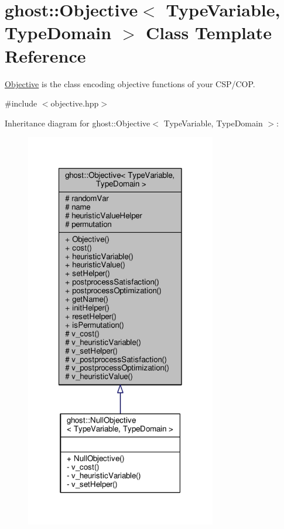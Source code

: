 \hypertarget{classghost_1_1Objective}{\section{ghost\-:\-:Objective$<$ Type\-Variable, Type\-Domain $>$ Class Template Reference}
\label{classghost_1_1Objective}
}


\hyperlink{classghost_1_1Objective}{Objective} is the class encoding objective functions of your C\-S\-P/\-C\-O\-P.  




{\ttfamily \#include $<$objective.\-hpp$>$}



Inheritance diagram for ghost\-:\-:Objective$<$ Type\-Variable, Type\-Domain $>$\-:
\nopagebreak
\begin{figure}[H]
\begin{center}
\leavevmode
\includegraphics[width=236pt]{classghost_1_1Objective__inherit__graph}
\end{center}
\end{figure}


